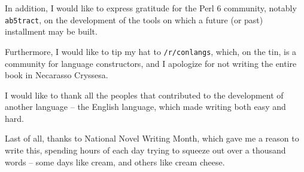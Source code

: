 In addition, I would like to express gratitude for the Perl 6 community, notably \texttt{ab5tract}, on the development of the tools on which a future (or past) installment may be built.

Furthermore, I would like to tip my hat to \texttt{/r/conlangs}, which, on the tin, is a community for language constructors, and I apologize for not writing the entire book in Necarasso Cryssesa.

I would like to thank all the peoples that contributed to the development of another language -- the English language, which made writing both easy and hard.

Last of all, thanks to National Novel Writing Month, which gave me a reason to write this, spending hours of each day trying to squeeze out over a thousand words -- some days like cream, and others like cream cheese.